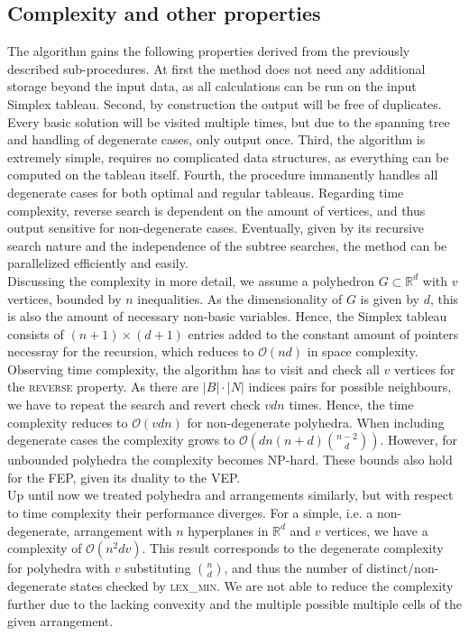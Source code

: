 \documentclass[a4paper, 11pt]{article}
\begin{document}
\subsection{Complexity and other properties}
The algorithm gains the following properties derived from the previously described sub-procedures. At first the method does not need any additional storage beyond the input data, as all calculations can be run on the input Simplex tableau. Second, by construction the output will be free of duplicates. Every basic solution will be visited multiple times, but due to the spanning tree and handling of degenerate cases, only output once. Third, the algorithm is extremely simple, requires no complicated data structures, as everything can be computed on the tableau itself. Fourth, the procedure immanently handles all degenerate cases for both optimal and regular tableaus. Regarding time complexity, reverse search is dependent on the amount of vertices, and thus output sensitive for non-degenerate cases.
Eventually, given by its recursive search nature and the independence of the subtree searches, the method can be parallelized efficiently and easily.\\

Discussing the complexity in more detail, we assume a polyhedron $G\subset\mathbb{R}^d$ with $v$ vertices, bounded by $n$ inequalities. As the dimensionality of $G$ is given by $d$, this is also the amount of necessary non-basic variables. Hence, the Simplex tableau consists of $(n+1)\times (d+1)$ entries added to the constant amount of pointers necessray for the recursion, which reduces to $\mathcal{O}(nd)$ in space complexity. \\
Observing time complexity, the algorithm has to visit and check all $v$ vertices for the \textsc{reverse} property. As there are $|B|\cdot|N|$ indices pairs for  possible neighbours, we have to repeat the search and revert check $vdn$ times. Hence, the time complexity reduces to $\mathcal{O}(vdn)$ for non-degenerate polyhedra. When including degenerate cases the complexity grows to $\mathcal{O}\left( dn(n+d){n-2\choose d} \right)$. However, for unbounded polyhedra the complexity becomes NP-hard. These bounds also hold for the FEP, given its duality to the VEP.\\

Up until now we treated polyhedra and arrangements similarly, but with respect to time complexity their performance diverges. For a simple, i.e. a non-degenerate, arrangement with $n$ hyperplanes in $\mathbb{R}^d$ and $v$ vertices, we have a complexity of $\mathcal{O}(n^2dv)$. This result corresponds to the degenerate complexity for polyhedra with $v$ substituting ${n\choose d}$, and thus the number of distinct/non-degenerate states checked by \textsc{lex\_min}. We are not able to reduce the complexity further due to the lacking convexity and the multiple possible multiple cells of the given arrangement.
\end{document}
